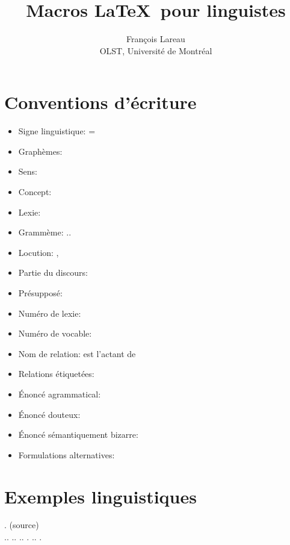 \documentclass{article}
\author{François Lareau\\OLST, Université de Montréal}
\title{Macros \LaTeX\ pour linguistes}
\begin{document}
\maketitle

\section{Conventions d'écriture}

\begin{itemize}
	\item Signe linguistique:  = \comb{}
	\item Graphèmes: 
	\item Sens: 
	\item Concept: 
	\item Lexie: 
	\item Grammème: ..
	\item Locution: , 
	\item Partie du discours: 
	\item Présupposé: 
	\item Numéro de lexie: 
	\item Numéro de vocable: 
	\item Nom de relation:  est l'actant  de 
	\item Relations étiquetées: 
	\item Énoncé agrammatical: \ungr{}
	\item Énoncé douteux: \doubt{}
	\item Énoncé sémantiquement bizarre: \infel{}
	\item Formulations alternatives: 
\end{itemize}


\section{Exemples linguistiques}

\ex. \label{ex:silence} \hfill(source)\\
		 \smaller{} .. ..  .. .  .. . \\
\end{document}
